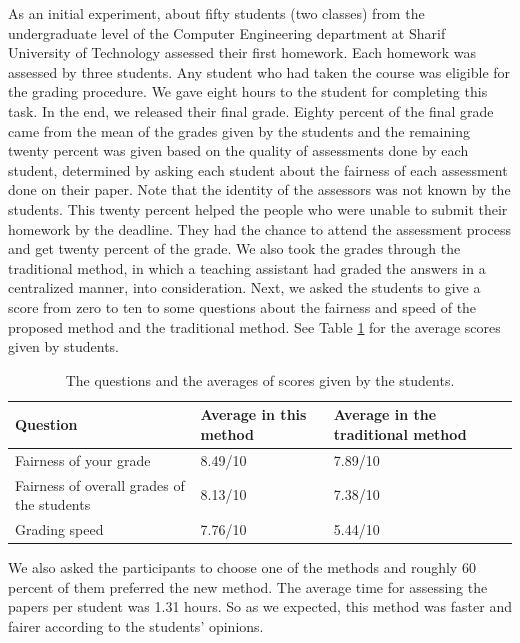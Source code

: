 \documentclass[manuscript,review,anonymous]{acmart}%
\begin{document}
As an initial experiment, about fifty students (two classes) from the undergraduate level of the Computer Engineering department at Sharif University of Technology assessed their first homework. Each homework was assessed by three students. Any student who had taken the course was eligible for the grading procedure. We gave eight hours to the student for completing this task. In the end, we released their final grade. Eighty percent of the final grade came from the mean of the grades given by the students and
the remaining twenty percent was given based on the quality of assessments done by each student, determined by asking each student about the fairness of each assessment done on their paper. Note that the identity of the assessors was not known by the students.
This twenty percent helped the people who were unable to submit their homework by the deadline. They had the chance to attend the assessment process and get twenty percent of the grade.
We also took the grades through the traditional method, in which a teaching assistant had graded the answers in a centralized manner, into consideration.
Next, we asked the students to give a score from zero to ten to some questions about the fairness and speed of the proposed method and the traditional method. See Table \ref{t1} for the average scores given by students.


\begin{table}[h!]
\caption{The questions and the averages of scores given by the students.}
\begin{center}
\begin{tabular}{| l | ll |}
 \hline
 Question & Average in this method & Average in the traditional method\\ \hline
 Fairness of your grade& 8.49/10& 7.89/10 \\ \hline
 
 Fairness of overall grades of the students &8.13/10 &7.38/10 \\ \hline
 
 Grading speed & 7.76/10 & 5.44/10 \\ \hline
 
 
 
 \end{tabular}
\end{center}
\label{t1}
\end{table}



We also asked the participants to choose one of the methods and roughly 60 percent of them preferred the new method.
The average time for assessing the papers per student was 1.31 hours.
So as we expected, this method was faster and fairer according to the students' opinions.
\end{document}
